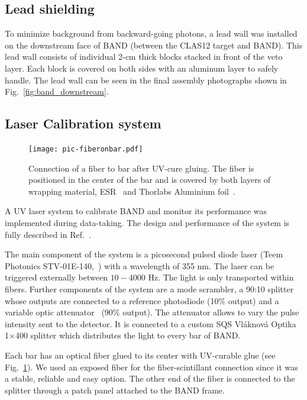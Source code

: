 \documentclass[review,number,sort&compress]{elsarticle}
\begin{document}
\subsection{Lead shielding}
To minimize background from backward-going photons, a
lead wall was installed on the downstream face of BAND (between the CLAS12 target
and BAND). This lead wall consists of individual 2-\si{\centi\meter}
thick blocks stacked in front of the veto layer. Each block is covered
on both sides with an aluminum layer to safely handle. The
lead wall can be seen in the final assembly photographs shown in
Fig.~\ref{fig:band_downstream}.


\subsection{Laser Calibration system}
\label{sec:laserystem}
\begin{figure}[tb]
	\centering
		\texttt{[image: pic-fiberonbar.pdf]}
	\caption{Connection of a fiber to bar after UV-cure gluing. The fiber is positioned in the center of the bar and is covered by both layers of wrapping material, ESR~\cite{3MESR} and Thorlabs Aluminium foil~\cite{thorlabsfoil}.}
	\label{fig:pic-fiberonbar}
\end{figure} 
A UV laser system to calibrate BAND and monitor its
performance was implemented during data-taking. 
The design and performance of the system is fully 
described in Ref.~\cite{band-laser}. 

The main component of the system is a picosecond pulsed diode laser 
(Teem Photonics STV-01E-140,~\cite{teem_laser}) with a wavelength 
of 355 \si{\nano\meter}. The laser can be triggered externally between 
$10-4000$ \si{\hertz}. The light is only transported within fibers. Further components of the system are a mode scrambler, a 90:10 splitter whose outputs are connected to a reference photodiode (10\% output) and a variable optic attenuator~\cite{attenuator} (90\% output). The attenuator allows to vary the pulse intensity sent to the detector. It is connected to a custom SQS Vl\'aknov\'a Optika 1$\times$400 splitter which distributes the light to every bar of BAND. 

Each bar has an optical fiber glued to its center with UV-curable glue (see
Fig.~\ref{fig:pic-fiberonbar}). We used an exposed fiber for the fiber-scintillant connection since it was a stable, reliable and easy option. The other end of the fiber is connected to the splitter through a patch panel attached to the BAND frame. 
\end{document}
